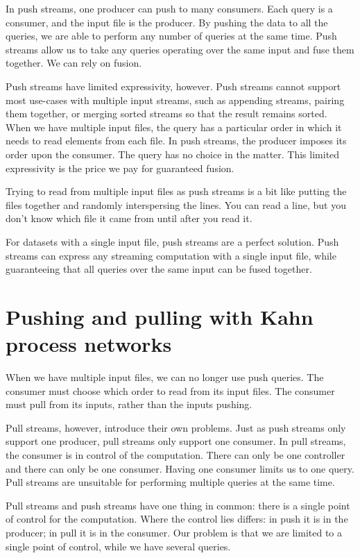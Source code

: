 In push streams, one producer can push to many consumers.
Each query is a consumer, and the input file is the producer.
By pushing the data to all the queries, we are able to perform any number of queries at the same time.
Push streams allow us to take any queries operating over the same input and fuse them together.
We can rely on fusion.

Push streams have limited expressivity, however.
Push streams cannot support most use-cases with multiple input streams, such as appending streams, pairing them together, or merging sorted streams so that the result remains sorted.
When we have multiple input files, the query has a particular order in which it needs to read elements from each file.
In push streams, the producer imposes its order upon the consumer.
The query has no choice in the matter.
This limited expressivity is the price we pay for guaranteed fusion.

Trying to read from multiple input files as push streams is a bit like putting the files together and randomly interspersing the lines.
You can read a line, but you don't know which file it came from until after you read it.

For datasets with a single input file, push streams are a perfect solution.
Push streams can express any streaming computation with a single input file, while guaranteeing that all queries over the same input can be fused together.

\section{Pushing and pulling with Kahn process networks}

When we have multiple input files, we can no longer use push queries.
The consumer must choose which order to read from its input files.
The consumer must pull from its inputs, rather than the inputs pushing.

Pull streams, however, introduce their own problems.
Just as push streams only support one producer, pull streams only support one consumer.
In pull streams, the consumer is in control of the computation.
There can only be one controller and there can only be one consumer.
Having one consumer limits us to one query.
Pull streams are unsuitable for performing multiple queries at the same time.


Pull streams and push streams have one thing in common: there is a single point of control for the computation.
Where the control lies differs: in push it is in the producer; in pull it is in the consumer.
Our problem is that we are limited to a single point of control, while we have several queries.


